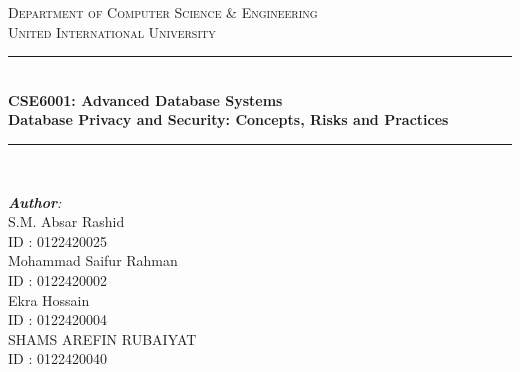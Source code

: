 \documentclass[12pt]{book} %
\begin{document}
\begin{titlepage}

\newcommand{\HRule}{\rule{\linewidth}{0.5mm}} %
\center %
 

\textsc{\Large Department of Computer Science \& Engineering}\\[0.5cm] %
\textsc{\Huge United International University}\\[1cm] %


\HRule \\[0.4cm]
{ \huge \LARGE \textbf{CSE6001: Advanced Database Systems}}\\ [0.4cm] %
{ {\Large \textbf{Database Privacy and Security: Concepts, Risks and Practices}}}\\
\HRule \\ [1cm]


\begin{minipage}{0.5\textwidth}
\begin{flushleft} \small
\emph{\textbf{\large Author}:}\\
S.M. Absar Rashid\\
ID : 0122420025\\
Mohammad Saifur Rahman\\
ID : 0122420002\\
Ekra Hossain\\
ID : 0122420004\\
SHAMS AREFIN RUBAIYAT\\
ID : 0122420040\\





\end{flushleft}
\end{minipage}
\end{titlepage}
\end{document}
